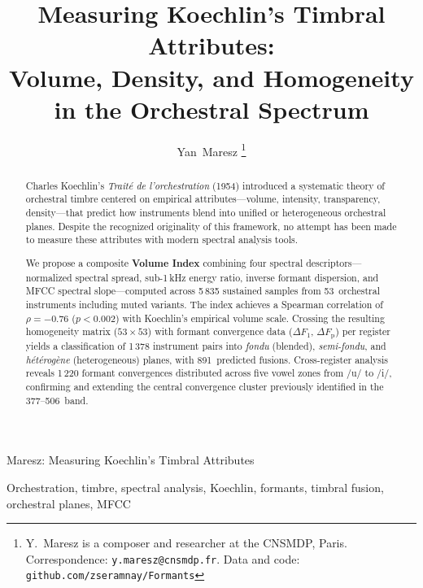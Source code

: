 \documentclass[journal]{IEEEtran}
\newcommand{\Fp}{F_\mathrm{p}}
\newcommand{\Hz}{\,\text{Hz}}
\begin{document}
\title{Measuring Koechlin's Timbral Attributes:\\Volume, Density, and Homogeneity\\in the Orchestral Spectrum}

\author{Yan~Maresz%
\thanks{Y.~Maresz is a composer and researcher at the CNSMDP, Paris. Correspondence: \texttt{y.maresz@cnsmdp.fr}. Data and code: \texttt{github.com/zseramnay/Formants}}%
}

%
{Maresz: Measuring Koechlin's Timbral Attributes}

\maketitle

\begin{abstract}
Charles Koechlin's \textit{Traité de l'orchestration} (1954) introduced a systematic theory of orchestral timbre centered on empirical attributes---volume, intensity, transparency, density---that predict how instruments blend into unified or heterogeneous orchestral planes. Despite the recognized originality of this framework, no attempt has been made to measure these attributes with modern spectral analysis tools. 

We propose a composite \textbf{Volume Index} combining four spectral descriptors---normalized spectral spread, sub-1\,kHz energy ratio, inverse formant dispersion, and MFCC spectral slope---computed across 5\,835 sustained samples from 53~orchestral instruments including muted variants. The index achieves a Spearman correlation of $\rho = -0.76$ ($p < 0.002$) with Koechlin's empirical volume scale. Crossing the resulting homogeneity matrix ($53 \times 53$) with formant convergence data ($\Delta F_1$, $\Delta\Fp$) per register yields a classification of 1\,378 instrument pairs into \textit{fondu} (blended), \textit{semi-fondu}, and \textit{hétérogène} (heterogeneous) planes, with 891~predicted fusions. Cross-register analysis reveals 1\,220 formant convergences distributed across five vowel zones from /u/ to /i/, confirming and extending the central convergence cluster previously identified in the 377--506\Hz{} band.
\end{abstract}

\begin{IEEEkeywords}
Orchestration, timbre, spectral analysis, Koechlin, formants, timbral fusion, orchestral planes, MFCC
\end{IEEEkeywords}
\end{document}
